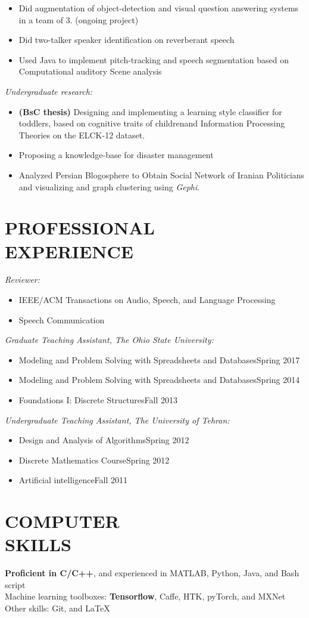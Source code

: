 \documentclass[margin, 10pt]{res}
\begin{document}
\begin{resume}
\begin{itemize}
\item Did augmentation of object-detection and visual question answering systems in a team of 3. (ongoing project)
\item Did two-talker speaker identification on reverberant speech
\item Used Java to implement pitch-tracking  and speech segmentation based on Computational auditory Scene analysis

\end{itemize}

\textit{Undergraduate research:}
\begin{itemize}
\item \textbf{(BsC thesis)} Designing and implementing a learning style classifier for toddlers, based on cognitive traits of childrenand Information Processing Theories on the ELCK-12 dataset.
\item Proposing a knowledge-base for disaster management
\item Analyzed Persian Blogosphere to Obtain Social Network of Iranian Politicians and visualizing and graph clustering using \textit{Gephi}.
\end{itemize}

\section{PROFESSIONAL \\ EXPERIENCE}
\textit{Reviewer:}
\begin{itemize}
\item IEEE/ACM Transactions on Audio, Speech, and Language Processing
\item Speech Communication
\end{itemize}

\textit{Graduate Teaching Assistant, The Ohio State University:}
\begin{itemize}
\item Modeling and Problem Solving with Spreadsheets and Databases\hfill Spring 2017
\item Modeling and Problem Solving with Spreadsheets and Databases\hfill Spring 2014 
\item Foundations I: Discrete Structures\hfill Fall 2013
\end{itemize}
\textit{Undergraduate Teaching Assistant, The University of Tehran:}
\begin{itemize}
\item Design and Analysis of Algorithms\hfill Spring 2012 
\item Discrete Mathematics Course\hfill Spring 2012
\item Artificial intelligence\hfill Fall 2011
\end{itemize}

\section{COMPUTER \\ SKILLS}
\textbf{Proficient in C/C++}, and experienced in MATLAB, Python, Java, and Bash script\\
Machine learning toolboxes: \textbf{Tensorflow},
Caffe, HTK, pyTorch, and MXNet\\
Other skills: Git, and \LaTeX

\end{resume}
\end{document}
